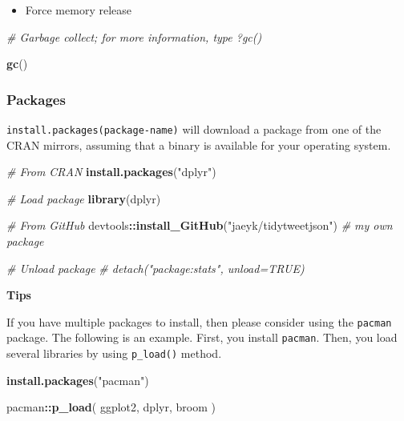 \documentclass[
]{book}
\newenvironment{Shaded}{\begin{snugshade}}{\end{snugshade}}
\newcommand{\CommentTok}[1]{\textcolor[rgb]{0.56,0.35,0.01}{\textit{#1}}}
\newcommand{\KeywordTok}[1]{\textcolor[rgb]{0.13,0.29,0.53}{\textbf{#1}}}
\newcommand{\NormalTok}[1]{#1}
\newcommand{\OperatorTok}[1]{\textcolor[rgb]{0.81,0.36,0.00}{\textbf{#1}}}
\newcommand{\StringTok}[1]{\textcolor[rgb]{0.31,0.60,0.02}{#1}}
\providecommand{\tightlist}{%
  \setlength{\itemsep}{0pt}\setlength{\parskip}{0pt}}
\begin{document}
\begin{itemize}
\tightlist
\item
  Force memory release
\end{itemize}

\begin{Shaded}
\begin{Highlighting}[]
\CommentTok{\# Garbage collect; for more information, type ?gc() }

\KeywordTok{gc}\NormalTok{()}
\end{Highlighting}
\end{Shaded}

\hypertarget{packages}{%
\subsubsection{Packages}\label{packages}}

\texttt{install.packages(package-name)} will download a package from one of the CRAN mirrors, assuming that a binary is available for your operating system.

\begin{Shaded}
\begin{Highlighting}[]
\CommentTok{\# From CRAN}
\KeywordTok{install.packages}\NormalTok{(}\StringTok{"dplyr"}\NormalTok{) }

\CommentTok{\# Load package }
\KeywordTok{library}\NormalTok{(dplyr)}

\CommentTok{\# From GitHub }
\NormalTok{devtools}\OperatorTok{::}\KeywordTok{install\_GitHub}\NormalTok{(}\StringTok{"jaeyk/tidytweetjson"}\NormalTok{) }\CommentTok{\# my own package }

\CommentTok{\# Unload package }
\CommentTok{\# detach("package:stats", unload=TRUE)}
\end{Highlighting}
\end{Shaded}

\textbf{Tips}

If you have multiple packages to install, then please consider using the \texttt{pacman} package. The following is an example. First, you install \texttt{pacman}. Then, you load several libraries by using \texttt{p\_load()} method.

\begin{Shaded}
\begin{Highlighting}[]
\KeywordTok{install.packages}\NormalTok{(}\StringTok{"pacman"}\NormalTok{)}

\NormalTok{pacman}\OperatorTok{::}\KeywordTok{p\_load}\NormalTok{(}
\NormalTok{  ggplot2,}
\NormalTok{  dplyr, }
\NormalTok{  broom}
\NormalTok{)}
\end{Highlighting}
\end{Shaded}
\end{document}
